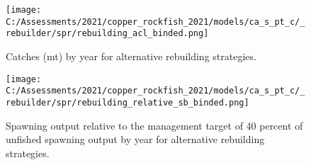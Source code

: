 \documentclass[11pt,
  english,
  a4paper,
]{article}
\begin{document}
\begin{figure}
\centering
\texttt{[image: C:/Assessments/2021/copper\_rockfish\_2021/models/ca\_s\_pt\_c/\_rebuilder/spr/rebuilding\_acl\_binded.png]}
\caption{Catches (mt) by year for alternative rebuilding strategies.\label{fig:acl-fig}}
\end{figure}

\tagmcend\tagstructend


\begin{figure}
\centering
\texttt{[image: C:/Assessments/2021/copper\_rockfish\_2021/models/ca\_s\_pt\_c/\_rebuilder/spr/rebuilding\_relative\_sb\_binded.png]}
\caption{Spawning output relative to the management target of 40 percent of unfished spawning output by year for alternative rebuilding strategies.\label{fig:rel-ssb-fig}}
\end{figure}

\tagmcend\tagstructend
\end{document}
